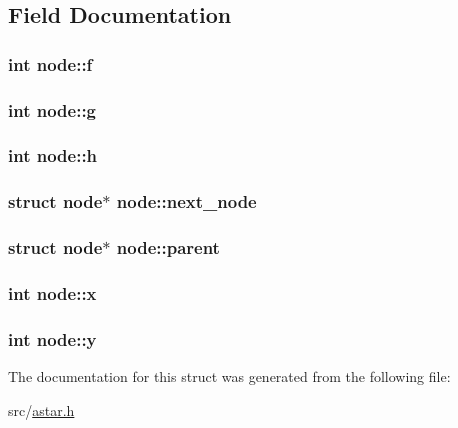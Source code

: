 \subsection{Field Documentation}
\hypertarget{structnode_aab10a587ed6c08a63dbb0d7fd0fd97da}{
\subsubsection[{f}]{\setlength{\rightskip}{0pt plus 5cm}int node\-::f}}\label{structnode_aab10a587ed6c08a63dbb0d7fd0fd97da}
\hypertarget{structnode_a9ef0925236bc4d4018d1443570e862c7}{
\subsubsection[{g}]{\setlength{\rightskip}{0pt plus 5cm}int node\-::g}}\label{structnode_a9ef0925236bc4d4018d1443570e862c7}
\hypertarget{structnode_a850e8af553a6eb934ef47e3a05a3b28b}{
\subsubsection[{h}]{\setlength{\rightskip}{0pt plus 5cm}int node\-::h}}\label{structnode_a850e8af553a6eb934ef47e3a05a3b28b}
\hypertarget{structnode_a24c054564fa79112d4b878d2576d3b4f}{
\subsubsection[{next\-\_\-node}]{\setlength{\rightskip}{0pt plus 5cm}struct {\bf node}$\ast$ node\-::next\-\_\-node}}\label{structnode_a24c054564fa79112d4b878d2576d3b4f}
\hypertarget{structnode_a05e4fe9e0177ba2d8dbd2c487cfddd53}{
\subsubsection[{parent}]{\setlength{\rightskip}{0pt plus 5cm}struct {\bf node}$\ast$ node\-::parent}}\label{structnode_a05e4fe9e0177ba2d8dbd2c487cfddd53}
\hypertarget{structnode_a64dd8b65a7d38c632a017d7f36444dbb}{
\subsubsection[{x}]{\setlength{\rightskip}{0pt plus 5cm}int node\-::x}}\label{structnode_a64dd8b65a7d38c632a017d7f36444dbb}
\hypertarget{structnode_ae944a3a75efb9856fa5c6f2221e2b49e}{
\subsubsection[{y}]{\setlength{\rightskip}{0pt plus 5cm}int node\-::y}}\label{structnode_ae944a3a75efb9856fa5c6f2221e2b49e}


The documentation for this struct was generated from the following file\-:\begin{DoxyCompactItemize}
\item 
src/\hyperlink{astar_8h}{astar.\-h}\end{DoxyCompactItemize}
